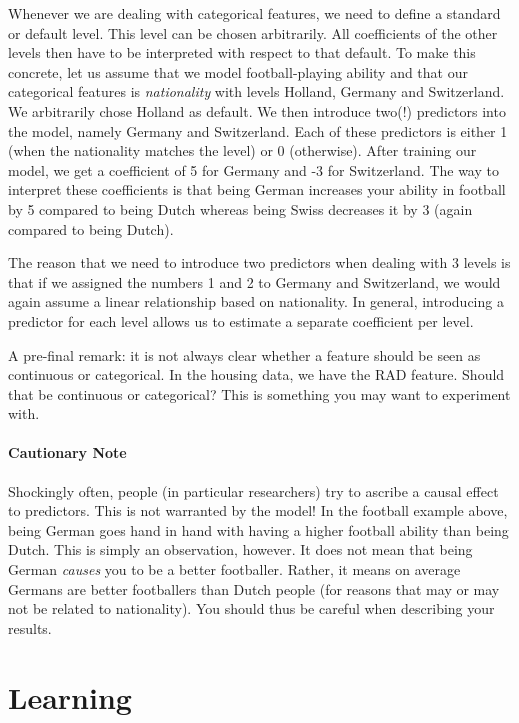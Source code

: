 \documentclass[11pt, leqno, a4paper]{article}
\begin{document}
Whenever we are dealing with categorical features, we need to define a standard or default level. This
level can be chosen arbitrarily. All coefficients of the other levels then have to be interpreted with
respect to that default. To make this concrete, let us assume that we model football-playing ability and
that our categorical features is \textit{nationality} with levels Holland, Germany and Switzerland.
We arbitrarily chose Holland as default. We then introduce two(!) predictors into the model, namely
Germany and Switzerland. Each of these predictors is either 1 (when the nationality matches the level)
or 0 (otherwise). After training our model, we get a coefficient of 5 for Germany and -3 for Switzerland.
The way to interpret these coefficients is that being German increases your ability in football by 5
compared to being Dutch whereas being Swiss decreases it by 3 (again compared to being Dutch).

The reason that we need to introduce two predictors when dealing with 3 levels is that if we assigned
the numbers 1 and 2 to Germany and Switzerland, we would again assume a linear relationship based on
nationality. In general, introducing a predictor for each level allows us to estimate a separate coefficient
per level.

A pre-final remark: it is not always clear whether a feature should be seen as continuous or categorical.
In the housing data, we have the RAD feature. Should that be continuous or categorical? This is
something you may want to experiment with.

\paragraph{Cautionary Note} Shockingly often, people (in particular researchers) try to ascribe 
a causal effect to predictors. This is not warranted by the model! In the football example above, being
German goes hand in hand with having a higher football ability than being Dutch. This is simply an 
observation, however. It does not mean that being German \textit{causes} you to be a better footballer.
Rather, it means on average Germans are better footballers than Dutch people
(for reasons that may or may not be related to nationality). You should thus be careful when describing
your results.

\section{Learning}
\end{document}

